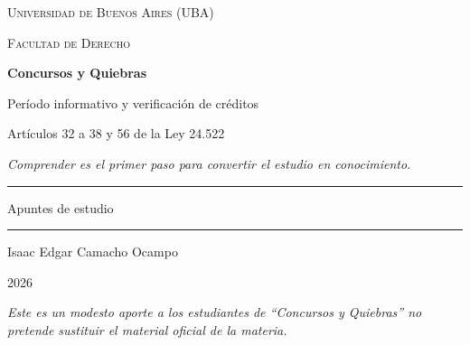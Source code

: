 \documentclass[12pt,oneside]{book}
\newcommand{\universidad}{Universidad de Buenos Aires (UBA)}
\newcommand{\facultad}{Facultad de Derecho}
\newcommand{\materia}{Concursos y Quiebras}
\newcommand{\titulo}{Período informativo y verificación de créditos}
\newcommand{\subtitulo}{Artículos 32 a 38 y 56 de la Ley 24.522}
\newcommand{\autor}{Isaac Edgar Camacho Ocampo}
\newcommand{\anio}{2026}
\begin{document}
\begin{titlepage}

\thispagestyle{empty}

\begin{center}

\vspace*{1cm}

{\large \textsc{\universidad}}

\vspace{0.2cm}

{\large \textsc{\facultad}}

\vspace{3cm}

{\Huge \textbf{\materia}}

\vspace{1cm}

{\LARGE \titulo}

\vspace{0.3cm}

{\large \subtitulo}

\vspace{0.8cm}

\textit{Comprender es el primer paso para convertir el estudio en conocimiento.}

\vspace{1.2cm}

\rule{0.70\textwidth}{0.5pt}

\vspace{0.5cm}

{\large Apuntes de estudio}

\vspace{0.5cm}

\rule{0.70\textwidth}{0.5pt}

\vfill

{\large \autor}

\vspace{0.3cm}

{\large \anio}

\end{center}

\vfill

\begin{flushleft}
\textit{Este es un modesto aporte a los estudiantes de ``Concursos y Quiebras'' no pretende sustituir el material oficial de la materia.}
\end{flushleft}

\end{titlepage}

\tableofcontents
\end{document}
